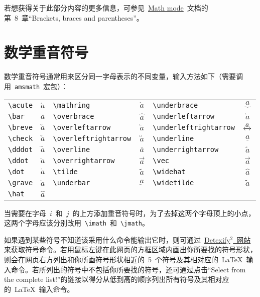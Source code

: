 若想获得关于此部分内容的更多信息，可参见~\href{http://tug.ctan.org/cgi-bin/ctanPackageInformation.py?id=voss-mathmode}{Math mode}~文档的第~8~章“Brackets, braces and parentheses”。

\section{数学重音符号}

数学重音符号通常用来区分同一字母表示的不同变量，输入方法如下（需要调用~\verb|amsmath|~宏包）：

\vspace{0.5em}\noindent\wuhao\begin{tabularx}{\textwidth}{Xc|Xc|Xc}
 \verb|\acute| & $\acute{a}$ & \verb|\mathring| & $\mathring{a}$ & \verb|\underbrace| & $\underbrace{a}$ \\
 \verb|\bar| & $\bar{a}$ & \verb|\overbrace| & $\overbrace{a}$ & \verb|\underleftarrow| & $\underleftarrow{a}$ \\
 \verb|\breve| & $\breve{a}$ & \verb|\overleftarrow| & $\overleftarrow{a}$ & \verb|\underleftrightarrow| & $\underleftrightarrow{a}$ \\
 \verb|\check| & $\check{a}$ & \verb|\overleftrightarrow| & $\overleftrightarrow{a}$ & \verb|\underline| & $\underline{a}$ \\
 \verb|\dddot| & $\dddot{a}$ & \verb|\overline| & $\overline{a}$ & \verb|\underrightarrow| & $\underrightarrow{a}$ \\
 \verb|\ddot| & $\ddot{a}$ & \verb|\overrightarrow| & $\overrightarrow{a}$ & \verb|\vec| & $\vec{a}$ \\
 \verb|\dot| & $\dot{a}$ & \verb|\tilde| & $\tilde{a}$ & \verb|\widehat| & $\widehat{a}$ \\
 \verb|\grave| & $\grave{a}$ & \verb|\underbar| & $\underbar{a}$ & \verb|\widetilde| & $\widetilde{a}$ \\
 \verb|\hat| & $\hat{a}$
\end{tabularx}\vspace{0.5em}
\xiaosi 当需要在字母~$i$~和~$j$~的上方添加重音符号时，为了去掉这两个字母顶上的小点，这两个字母应该分别改用~\verb|\imath|~和~\verb|\jmath|。

如果遇到某些符号不知道该采用什么命令能输出它时，则可通过~\href{http://detexify.kirelabs.org/classify.html}{Detexify$^2$~网站}来获取符号命令。若用鼠标左键在此网页的方框区域内画出你所要找的符号形状，则会在网页右方列出和你所画符号形状相近的~5~个符号及其相对应的~\LaTeX~输入命令。若所列出的符号中不包括你所要找的符号，还可通过点击“Select from the complete list!”的链接以得分从低到高的顺序列出所有符号及其相对应的~\LaTeX~输入命令。

